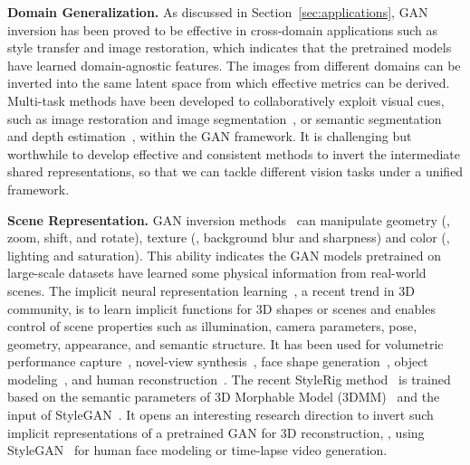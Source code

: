 \vspace{1mm}
\noindent\textbf{Domain Generalization.}
As discussed in Section~\ref{sec:applications}, GAN inversion has been proved to be effective in cross-domain applications such as style transfer and image restoration, which indicates that the pretrained models have learned domain-agnostic features. 
The images from different domains can be inverted into the same latent space from which effective metrics can be derived. 
Multi-task methods have been developed to collaboratively exploit visual cues, such as image restoration and image segmentation~\cite{xia2019adverse}, or semantic segmentation and depth estimation~\cite{Nekrasov2019joint,zhan2019joint}, within the GAN framework.
It is challenging but worthwhile to develop effective and consistent methods to invert the intermediate shared representations, so that we can tackle different vision tasks under a unified framework. 

\vspace{1mm}
\noindent\textbf{Scene Representation.}
GAN inversion methods~\cite{abdal2020styleflow,voynov2020latent} can manipulate geometry (\eg, zoom, shift, and rotate), texture (\eg, background blur and sharpness) and color (\eg, lighting and saturation).
This ability indicates the GAN models pretrained on large-scale datasets have learned some physical information from real-world scenes.
The implicit neural representation learning~\cite{chen2019learning,tucker2020single,rajeswar2020pix2shape}, a recent trend in 3D community, is to learn implicit functions for 3D shapes or scenes and enables control of scene properties such as illumination, camera parameters, pose, geometry, appearance, and semantic structure.
It has been used for volumetric performance capture~\cite{chen2020free,liu2020neural,lombardi2019neural}, novel-view synthesis~\cite{martin2020nerf,martin2020nerf}, face shape generation~\cite{wu2020unsupervised}, object modeling~\cite{nguyen2020blockgan,kato2019self}, and human reconstruction~\cite{zheng2020pamir,bhatnagar2020combining,he2020geo,saito2020pifuhd}.
The recent StyleRig method~\cite{tewari2020stylerig} is trained based on the semantic parameters of 3D Morphable Model (3DMM)~\cite{egger20203d} and the input of StyleGAN~\cite{karras2019style}.
It opens an interesting research direction to invert such implicit representations of a pretrained GAN for 3D reconstruction, \eg, using StyleGAN~\cite{karras2019style} for human face modeling or time-lapse video generation.

